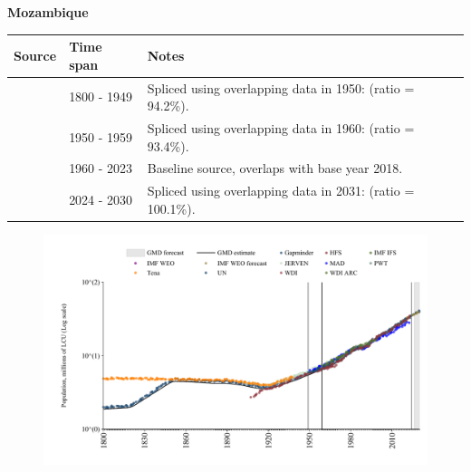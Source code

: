 \documentclass[12pt,a4paper,landscape]{article}
\begin{document}
\begin{adjustbox}{max totalsize={\paperwidth}{\paperheight},center}
\begin{minipage}[t][\textheight][t]{\textwidth}
\vspace*{0.5cm}
{}
\begin{center}
{\Large\bfseries Mozambique}
\end{center}
\vspace{0.5cm}
\begin{table}[H]
\centering
\small
\begin{tabular}{|l|l|l|}
\hline
\textbf{Source} & \textbf{Time span} & \textbf{Notes} \\
\hline
\rowcolor{white}\cite{Gapminder}& 1800 - 1949 &Spliced using overlapping data in 1950: (ratio = 94.2\%).\\
\rowcolor{lightgray}\cite{IMF_IFS}& 1950 - 1959 &Spliced using overlapping data in 1960: (ratio = 93.4\%).\\
\rowcolor{white}\cite{WDI}& 1960 - 2023 &Baseline source, overlaps with base year 2018.\\
\rowcolor{lightgray}\cite{Gapminder}& 2024 - 2030 &Spliced using overlapping data in 2031: (ratio = 100.1\%).\\
\hline
\end{tabular}
\end{table}
\begin{figure}[H]
\centering
\includegraphics[width=\textwidth,height=0.6\textheight,keepaspectratio]{graphs/MOZ_pop.pdf}
\end{figure}
\end{minipage}
\end{adjustbox}
\end{document}
